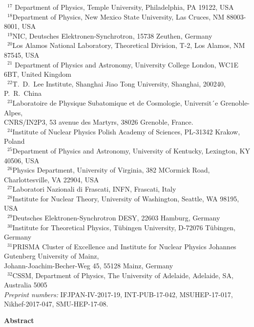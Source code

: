 \documentclass[twoside,12pt]{article}
\numberwithin{equation}{section}
\numberwithin{figure}{section}
\numberwithin{table}{section}
\begin{document}
\begin{center}
{~$^{17}$ Department of Physics, 
Temple University, Philadelphia, PA 19122, USA\\
~$^{18}$Department of Physics, 
New Mexico State University, Las Cruces, NM 88003-8001, USA\\
~$^{19}$NIC, Deutsches Elektronen-Synchrotron, 15738 Zeuthen, Germany\\
~$^{20}$Los Alamos National Laboratory, Theoretical Division, 
T-2, Los Alamos, NM 87545, USA\\
~$^{21}$ Department of Physics and Astronomy, 
University College London, WC1E 6BT, United Kingdom\\
~$^{22}$T.~D.~Lee Institute, 
Shanghai Jiao Tong University, Shanghai, 200240, P.~R.~China\\
~$^{23}$Laboratoire de Physique Subatomique et de Cosmologie, 
Universit´e Grenoble-Alpes,\\ 
CNRS/IN2P3, 53 avenue des Martyrs,  38026 Grenoble, France. \\
~$^{24}$Institute of Nuclear Physics Polish Academy of Sciences, 
PL-31342 Krakow, Poland\\
~$^{25}$Department of Physics and Astronomy, University of Kentucky, 
Lexington, KY 40506, USA\\
~$^{26}$Physics Department, University of Virginia, 382 MCormick Road,
Charlottesville, VA 22904, USA\\
~$^{27}$Laboratori Nazionali di Frascati, INFN, Frascati, Italy\\
~$^{28}$Institute for Nuclear Theory, 
University of Washington, Seattle, WA 98195, USA\\
~$^{29}$Deutsches Elektronen-Synchrotron DESY, 22603 Hamburg, Germany\\
~$^{30}$Institute for Theoretical Physics, 
T\"ubingen University, D-72076 T\"ubingen, Germany\\
~$^{31}$PRISMA Cluster of Excellence and Institute for Nuclear Physics 
Johannes Gutenberg University of Mainz,\\ 
Johann-Joachim-Becher-Weg 45, 55128 Mainz, Germany\\
~$^{32}$CSSM, Department of Physics, 
The University of Adelaide, Adelaide, SA, Australia 5005\\
}
\vspace{0.3cm}
       {\it Preprint numbers:} 
IFJPAN-IV-2017-19,       
INT-PUB-17-042, 
MSUHEP-17-017, 
Nikhef-2017-047, 
SMU-HEP-17-08.




\clearpage


$\quad$\\
\vspace{1.5cm}
{\bf \large Abstract}

\end{center}
\end{document}
